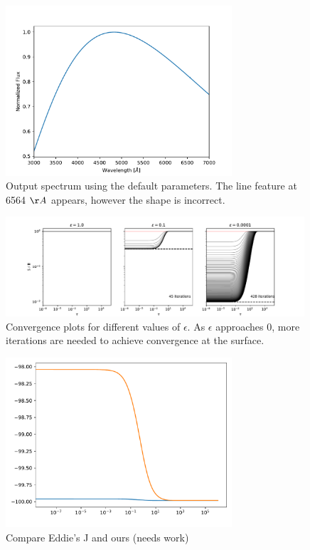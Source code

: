 \documentclass[12pt]{article}
\begin{document}
\begin{figure}[ht]
 \centering
 \includegraphics[width=0.75\textwidth]{test_spectrum.pdf}
 \caption{Output spectrum using the default parameters. The line feature at 6564 $\AA$ appears, however the shape is incorrect.}
\end{figure}

\begin{figure}[ht]
 \centering
 \includegraphics[width=0.99\textwidth]{eps_convergence.pdf}
 \caption{Convergence plots for different values of $\epsilon$. As $\epsilon$ approaches 0, more iterations are needed to achieve convergence at the surface.}
\end{figure}

\begin{figure}[ht]
 \centering
 \includegraphics[width=0.75\textwidth]{J_comparison.pdf}
 \caption{Compare Eddie's J and ours (needs work)}
\end{figure}
\end{document}
